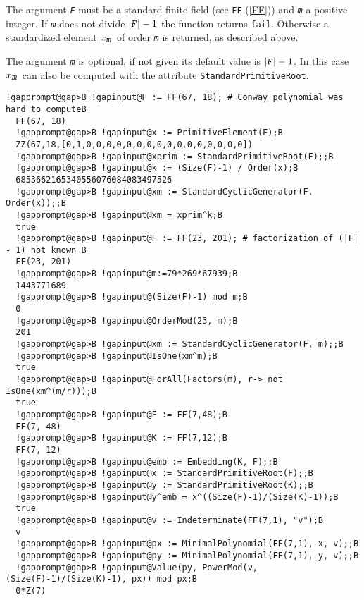 \documentclass[a4paper,11pt]{report}
\begin{document}
{{{ The argument \mbox{\texttt{\mdseries\slshape F}} must be a standard finite field (see \texttt{FF} (\ref{FF})) and \mbox{\texttt{\mdseries\slshape m}} a positive integer. If \mbox{\texttt{\mdseries\slshape m}} does not divide $|\mbox{\texttt{\mdseries\slshape F}}| - 1$ the function returns \texttt{fail}. Otherwise a standardized element $x_{\mbox{\texttt{\mdseries\slshape m}}}$ of order \mbox{\texttt{\mdseries\slshape m}} is returned, as described above. 

 The argument \mbox{\texttt{\mdseries\slshape m}} is optional, if not given its default value is $|\mbox{\texttt{\mdseries\slshape F}}| - 1$. In this case $x_{\mbox{\texttt{\mdseries\slshape m}}}$ can also be computed with the attribute \texttt{StandardPrimitiveRoot}. 
\begin{Verbatim}[commandchars=!@B,fontsize=\small,frame=single,label=Example]
  !gapprompt@gap>B !gapinput@F := FF(67, 18); # Conway polynomial was hard to computeB
  FF(67, 18)
  !gapprompt@gap>B !gapinput@x := PrimitiveElement(F);B
  ZZ(67,18,[0,1,0,0,0,0,0,0,0,0,0,0,0,0,0,0,0,0])
  !gapprompt@gap>B !gapinput@xprim := StandardPrimitiveRoot(F);;B
  !gapprompt@gap>B !gapinput@k := (Size(F)-1) / Order(x);B
  6853662165340556076084083497526
  !gapprompt@gap>B !gapinput@xm := StandardCyclicGenerator(F, Order(x));;B
  !gapprompt@gap>B !gapinput@xm = xprim^k;B
  true
  !gapprompt@gap>B !gapinput@F := FF(23, 201); # factorization of (|F| - 1) not known B
  FF(23, 201)
  !gapprompt@gap>B !gapinput@m:=79*269*67939;B
  1443771689
  !gapprompt@gap>B !gapinput@(Size(F)-1) mod m;B
  0
  !gapprompt@gap>B !gapinput@OrderMod(23, m);B
  201
  !gapprompt@gap>B !gapinput@xm := StandardCyclicGenerator(F, m);;B
  !gapprompt@gap>B !gapinput@IsOne(xm^m);B
  true
  !gapprompt@gap>B !gapinput@ForAll(Factors(m), r-> not IsOne(xm^(m/r)));B
  true
  !gapprompt@gap>B !gapinput@F := FF(7,48);B
  FF(7, 48)
  !gapprompt@gap>B !gapinput@K := FF(7,12);B
  FF(7, 12)
  !gapprompt@gap>B !gapinput@emb := Embedding(K, F);;B
  !gapprompt@gap>B !gapinput@x := StandardPrimitiveRoot(F);;B
  !gapprompt@gap>B !gapinput@y := StandardPrimitiveRoot(K);;B
  !gapprompt@gap>B !gapinput@y^emb = x^((Size(F)-1)/(Size(K)-1));B
  true
  !gapprompt@gap>B !gapinput@v := Indeterminate(FF(7,1), "v");B
  v
  !gapprompt@gap>B !gapinput@px := MinimalPolynomial(FF(7,1), x, v);;B
  !gapprompt@gap>B !gapinput@py := MinimalPolynomial(FF(7,1), y, v);;B
  !gapprompt@gap>B !gapinput@Value(py, PowerMod(v, (Size(F)-1)/(Size(K)-1), px)) mod px;B
  0*Z(7)
\end{Verbatim}
 }

 }

 }
\end{document}
